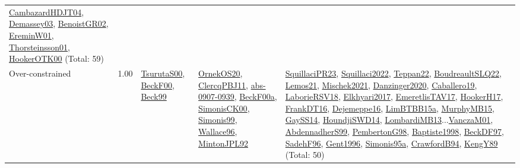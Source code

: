 {\begin{longtable}{p{3cm}r>{\raggedright\arraybackslash}p{6cm}>{\raggedright\arraybackslash}p{6cm}>{\raggedright\arraybackslash}p{8cm}}
\hyperref[detail:CambazardHDJT04]{CambazardHDJT04}, \hyperref[detail:Demassey03]{Demassey03}, \hyperref[detail:BenoistGR02]{BenoistGR02}, \hyperref[detail:EreminW01]{EreminW01}, \hyperref[detail:Thorsteinsson01]{Thorsteinsson01}, \hyperref[detail:HookerOTK00]{HookerOTK00} (Total: 59)\\
\index{Over-constrained}\index{Concepts!Over-constrained}Over-constrained &  1.00 & \hyperref[detail:TsurutaS00]{TsurutaS00}, \hyperref[detail:BeckF00]{BeckF00}, \hyperref[detail:Beck99]{Beck99} & \hyperref[detail:OrnekOS20]{OrnekOS20}, \hyperref[detail:ClercqPBJ11]{ClercqPBJ11}, \hyperref[detail:abs-0907-0939]{abs-0907-0939}, \hyperref[detail:BeckF00a]{BeckF00a}, \hyperref[detail:SimonisCK00]{SimonisCK00}, \hyperref[detail:Simonis99]{Simonis99}, \hyperref[detail:Wallace96]{Wallace96}, \hyperref[detail:MintonJPL92]{MintonJPL92} & \hyperref[detail:SquillaciPR23]{SquillaciPR23}, \hyperref[detail:Squillaci2022]{Squillaci2022}, \hyperref[detail:Teppan22]{Teppan22}, \hyperref[detail:BoudreaultSLQ22]{BoudreaultSLQ22}, \hyperref[detail:Lemos21]{Lemos21}, \hyperref[detail:Mischek2021]{Mischek2021}, \hyperref[detail:Danzinger2020]{Danzinger2020}, \hyperref[detail:Caballero19]{Caballero19}, \hyperref[detail:LaborieRSV18]{LaborieRSV18}, \hyperref[detail:Elkhyari2017]{Elkhyari2017}, \hyperref[detail:EmeretlisTAV17]{EmeretlisTAV17}, \hyperref[detail:HookerH17]{HookerH17}, \hyperref[detail:FrankDT16]{FrankDT16}, \hyperref[detail:Dejemeppe16]{Dejemeppe16}, \hyperref[detail:LimBTBB15a]{LimBTBB15a}, \hyperref[detail:MurphyMB15]{MurphyMB15}, \hyperref[detail:GaySS14]{GaySS14}, \hyperref[detail:HoundjiSWD14]{HoundjiSWD14}, \hyperref[detail:LombardiMB13]{LombardiMB13}...\hyperref[detail:VanczaM01]{VanczaM01}, \hyperref[detail:AbdennadherS99]{AbdennadherS99}, \hyperref[detail:PembertonG98]{PembertonG98}, \hyperref[detail:Baptiste1998]{Baptiste1998}, \hyperref[detail:BeckDF97]{BeckDF97}, \hyperref[detail:SadehF96]{SadehF96}, \hyperref[detail:Gent1996]{Gent1996}, \hyperref[detail:Simonis95a]{Simonis95a}, \hyperref[detail:CrawfordB94]{CrawfordB94}, \hyperref[detail:KengY89]{KengY89} (Total: 50)\\

\end{longtable}}
